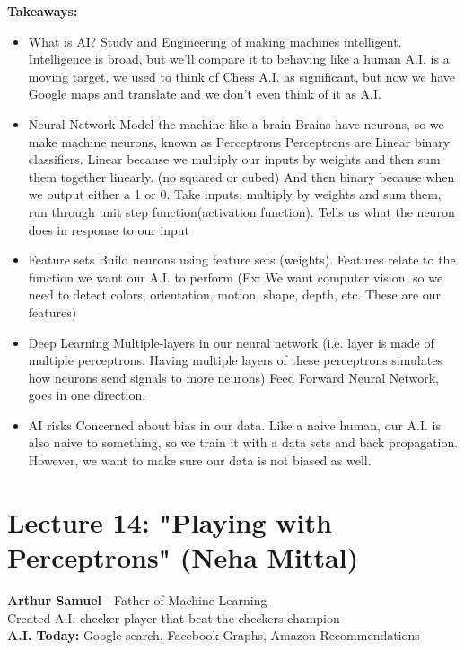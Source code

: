 \documentclass{article}
\begin{document}
\textbf{Takeaways:}
\begin{itemize}
    \item What is AI?
        \subitem Study and Engineering of making machines intelligent. Intelligence is broad, but we'll compare it to behaving like a human
        \subitem A.I. is a moving target, we used to think of Chess A.I. as significant, but now we have Google maps and translate and we don't even think of it as A.I. 
    \item Neural Network
        \subitem Model the machine like a brain
        \subitem Brains have neurons, so we make machine neurons, known as Perceptrons
        \subitem Perceptrons are Linear binary classifiers. Linear because we multiply our inputs by weights and then sum them together linearly. (no squared or cubed) And then binary because when we output either a 1 or 0. 
        \subitem Take inputs, multiply by weights and sum them, run through unit step function(activation function). Tells us what the neuron does in response to our input 
    \item Feature sets
        \subitem Build neurons using feature sets (weights). 
        \subitem Features relate to the function we want our A.I. to perform (Ex: We want computer vision, so we need to detect colors, orientation, motion, shape, depth, etc. These are our features)
    \item Deep Learning
        \subitem Multiple-layers in our neural network (i.e. layer is made of multiple perceptrons. Having multiple layers of these perceptrons simulates how neurons send signals to more neurons)
        \subitem Feed Forward Neural Network, goes in one direction. 
    \item AI risks
        \subitem Concerned about bias in our data. 
        \subitem Like a naive human, our A.I. is also naive to something, so we train it with a data sets and back propagation. 
        \subitem However, we want to make sure our data is not biased as well. 
\end{itemize}

\newpage
\section{Lecture 14: "Playing with Perceptrons" (Neha Mittal)}
\textbf{Arthur Samuel} - Father of Machine Learning \\
\indent Created A.I. checker player that beat the checkers champion \\

\noindent \textbf{A.I. Today:} Google search, Facebook Graphs, Amazon Recommendations \\
\end{document}
